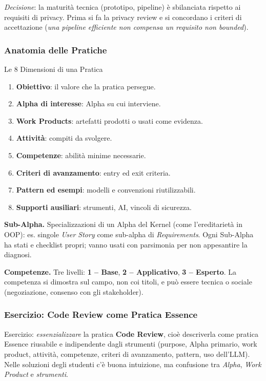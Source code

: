 \documentclass[12pt]{extarticle}
\begin{document}
\noindent \textit{Decisione}: la maturità tecnica (prototipo, pipeline) è sbilanciata rispetto ai requisiti di privacy. Prima si fa la privacy review e si concordano i criteri di accettazione (\textit{una pipeline efficiente non compensa un requisito non bounded}).

\subsubsection{Anatomia delle Pratiche}
\begin{cbox}{Le 8 Dimensioni di una Pratica}
\begin{enumerate}
    \item \textbf{Obiettivo}: il valore che la pratica persegue.
    \item \textbf{Alpha di interesse}: Alpha su cui interviene.
    \item \textbf{Work Products}: artefatti prodotti o usati come evidenza.
    \item \textbf{Attività}: compiti da svolgere.
    \item \textbf{Competenze}: abilità minime necessarie.
    \item \textbf{Criteri di avanzamento}: entry ed exit criteria.
    \item \textbf{Pattern ed esempi}: modelli e convenzioni riutilizzabili.
    \item \textbf{Supporti ausiliari}: strumenti, AI, vincoli di sicurezza.
\end{enumerate}
\end{cbox}

\noindent \textbf{Sub-Alpha.} Specializzazioni di un Alpha del Kernel (come l'ereditarietà in OOP): es. singole \textit{User Story} come sub-alpha di \textit{Requirements}. Ogni Sub-Alpha ha stati e checklist propri; vanno usati con parsimonia per non appesantire la diagnosi.

\medskip
\noindent \textbf{Competenze.} Tre livelli: \textbf{1 -- Base}, \textbf{2 -- Applicativo}, \textbf{3 -- Esperto}. La competenza si dimostra sul campo, non coi titoli, e può essere tecnica o sociale (negoziazione, consenso con gli stakeholder).


\subsubsection{Esercizio: Code Review come Pratica Essence}
\noindent Esercizio: \textit{essenzializzare} la pratica \textbf{Code Review}, cioè descriverla come pratica Essence riusabile e indipendente dagli strumenti (purpose, Alpha primario, work product, attività, competenze, criteri di avanzamento, pattern, uso dell'LLM). Nelle soluzioni degli studenti c'è buona intuizione, ma confusione tra \textit{Alpha}, \textit{Work Product} e \textit{strumenti}.
\end{document}
